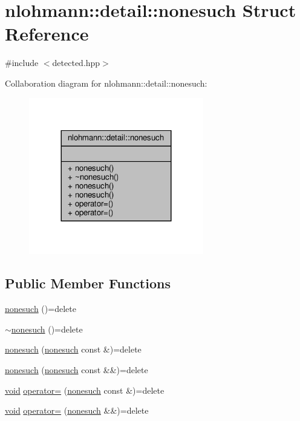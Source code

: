 \hypertarget{structnlohmann_1_1detail_1_1nonesuch}{}\section{nlohmann\+:\+:detail\+:\+:nonesuch Struct Reference}
\label{structnlohmann_1_1detail_1_1nonesuch}


{\ttfamily \#include $<$detected.\+hpp$>$}



Collaboration diagram for nlohmann\+:\+:detail\+:\+:nonesuch\+:\nopagebreak
\begin{figure}[H]
\begin{center}
\leavevmode
\includegraphics[width=216pt]{structnlohmann_1_1detail_1_1nonesuch__coll__graph}
\end{center}
\end{figure}
\subsection*{Public Member Functions}
\begin{DoxyCompactItemize}
\item 
\hyperlink{structnlohmann_1_1detail_1_1nonesuch_a6fe87da966856c6cb06617940d90f010}{nonesuch} ()=delete
\item 
\hyperlink{structnlohmann_1_1detail_1_1nonesuch_a7b1119845860e548b67f1644a2084373}{$\sim$nonesuch} ()=delete
\item 
\hyperlink{structnlohmann_1_1detail_1_1nonesuch_a563462ef2d05fe60cdf1dc7f567dc276}{nonesuch} (\hyperlink{structnlohmann_1_1detail_1_1nonesuch}{nonesuch} const \&)=delete
\item 
\hyperlink{structnlohmann_1_1detail_1_1nonesuch_ad7719f7d2a00263be8b8d123870217d8}{nonesuch} (\hyperlink{structnlohmann_1_1detail_1_1nonesuch}{nonesuch} const \&\&)=delete
\item 
\hyperlink{namespacenlohmann_1_1detail_a59fca69799f6b9e366710cb9043aa77d}{void} \hyperlink{structnlohmann_1_1detail_1_1nonesuch_add6ef84c52a851e391cef514c85f2ffe}{operator=} (\hyperlink{structnlohmann_1_1detail_1_1nonesuch}{nonesuch} const \&)=delete
\item 
\hyperlink{namespacenlohmann_1_1detail_a59fca69799f6b9e366710cb9043aa77d}{void} \hyperlink{structnlohmann_1_1detail_1_1nonesuch_a78ca022a1b4defe4f7ba662843602231}{operator=} (\hyperlink{structnlohmann_1_1detail_1_1nonesuch}{nonesuch} \&\&)=delete
\end{DoxyCompactItemize}


